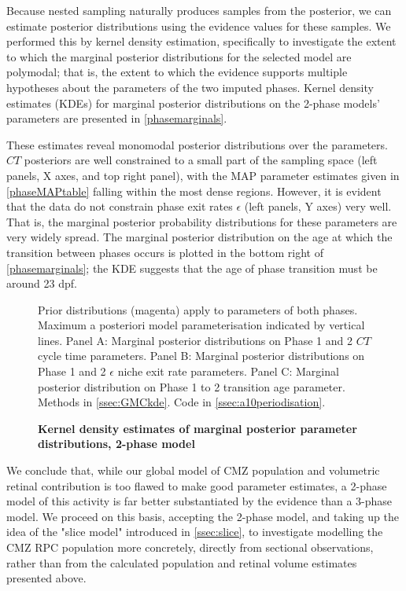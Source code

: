 Because nested sampling naturally produces samples from the posterior, we can estimate posterior distributions using the evidence values for these samples. We performed this by kernel density estimation, specifically to investigate the extent to which the marginal posterior distributions for the selected model are polymodal; that is, the extent to which the evidence supports multiple hypotheses about the parameters of the two imputed phases. Kernel density estimates (KDEs) for marginal posterior distributions on the 2-phase models' parameters are presented in \autoref{phasemarginals}. 

These estimates reveal monomodal posterior distributions over the parameters. $CT$ posteriors are well constrained to a small part of the sampling space (left panels, X axes, and top right panel), with the MAP parameter estimates given in \autoref{phaseMAPtable} falling within the most dense regions. However, it is evident that the data do not constrain phase exit rates $\epsilon$ (left panels, Y axes) very well. That is, the marginal posterior probability distributions for these parameters are very widely spread.  The marginal posterior distribution on the age at which the transition between phases occurs is plotted in the bottom right of \autoref{phasemarginals}; the KDE suggests that the age of phase transition must be around 23 dpf.

\begin{figure}[!h]
    \caption{{\bf Kernel density estimates of marginal posterior parameter distributions, 2-phase model}}
    Prior distributions (magenta) apply to parameters of both phases. Maximum a posteriori model parameterisation indicated by vertical lines.
    Panel A: Marginal posterior distributions on Phase 1 and 2 $CT$ cycle time parameters. 
    Panel B: Marginal posterior distributions on Phase 1 and 2 $\epsilon$ niche exit rate parameters.
    Panel C: Marginal posterior distribution on Phase 1 to 2 transition age parameter.
    \label{phasemarginals}
    Methods in \autoref{ssec:GMCkde}.
    Code in \autoref{ssec:a10periodisation}.    
\end{figure}

We conclude that, while our global model of CMZ population and volumetric retinal contribution is too flawed to make good parameter estimates, a 2-phase model of this activity is far better substantiated by the evidence than a 3-phase model. We proceed on this basis, accepting the 2-phase model, and taking up the idea of the "slice model" introduced in \autoref{ssec:slice}, to investigate modelling the CMZ RPC population more concretely, directly from sectional observations, rather than from the calculated population and retinal volume estimates presented above.

